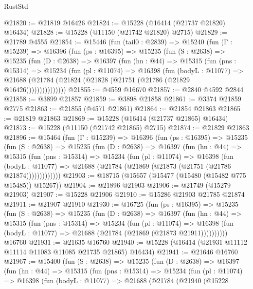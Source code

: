 \begin{lexlean}{RustStd}
\begin{coremodule}
@21820 := @21819 @16426
@21824 := @15228 (@16414 (@21737 @21820) @16434)
@21828 := @15228 (@11150 (@21742 @21820) @2715)
@21829 := @21789 @4555
@21854 := @15446
    (fun (tail0 : @2839) =>
    @15240
      (fun (Γ : @15239) =>
      @16396
        (fun (ps : @16395) =>
        @15235
          (fun (S : @2638) =>
          @15235
            (fun (D : @2638) =>
            @16397
              (fun (hn : @44) =>
              @15315
                (fun (pns : @15314) =>
                @15234
                  (fun (pl : @11074) =>
                  @16398
                    (fun (bodyL : @11077) =>
                    @21688 (@21784 (@21824 (@21828 (@21751 (@21786 (@21829 @16426)))))))))))))))
@21855 := @4559 @16670
@21857 := @2840 @4592 @2844
@21858 := @3899 @21857
@21859 := @3898 @21858
@21861 := @3374 @21859 @2775
@21863 := @21855 (@4571 @21861)
@21864 := @21854 @21863
@21865 := @21819 @21863
@21869 := @15228 (@16414 (@21737 @21865) @16434)
@21873 := @15228 (@11150 (@21742 @21865) @2715)
@21874 := @21829 @21863
@21896 := @15464
    (fun (Γ : @15239) =>
    @16396
      (fun (ps : @16395) =>
      @15235
        (fun (S : @2638) =>
        @15235
          (fun (D : @2638) =>
          @16397
            (fun (hn : @44) =>
            @15315
              (fun (pns : @15314) =>
              @15234
                (fun (pl : @11074) =>
                @16398
                  (fun (bodyL : @11077) =>
                  @21688 (@21784 (@21869 (@21873 (@21751 (@21786 @21874)))))))))))))
@21903 := @18715 (@15657 (@15477 (@15480 (@15482 @775 @15485)) @15267))
@21904 := @21896 @21903
@21906 := @21749 (@15279 @21903)
@21907 := @15228 @21906
@21910 := @15286 @21903 @21785 @21874
@21911 := @21907 @21910
@21930 := @16725
    (fun (ps : @16395) =>
    @15235
      (fun (S : @2638) =>
      @15235
        (fun (D : @2638) =>
        @16397
          (fun (hn : @44) =>
          @15315
            (fun (pns : @15314) =>
            @15234
              (fun (pl : @11074) =>
              @16398 (fun (bodyL : @11077) => @21688 (@21784 (@21869 (@21873 @21911))))))))))
    @16760
@21931 := @21635 @16760
@21940 := @15228 (@16414 (@21931 @11112 @11114 @11083 @11085 @21735 @21865) @16434)
@21941 := @21646 @16760
@21967 := @15400
    (fun (S : @2638) =>
    @15235
      (fun (D : @2638) =>
      @16397
        (fun (hn : @44) =>
        @15315
          (fun (pns : @15314) =>
          @15234
            (fun (pl : @11074) =>
            @16398
              (fun (bodyL : @11077) =>
              @21688
                (@21784
                  (@21940
                    (@15228

\end{coremodule}
\end{lexlean}
